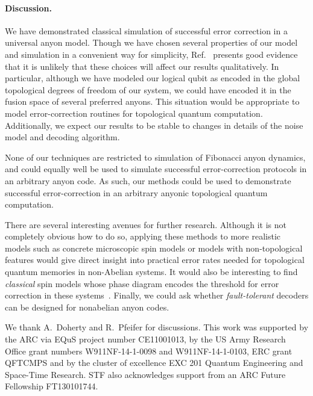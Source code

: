 \documentclass[aps, prl, letterpaper, twocolumn, superscriptaddress, notitlepage, 10pt]{revtex4-1}
\begin{document}
\paragraph{Discussion.}

We have demonstrated classical simulation of successful error correction in a universal anyon model. 
Though we have chosen several properties of our model and 
simulation in a convenient way for simplicity,
Ref.~\cite{Brell2013} presents good evidence that it is
unlikely that these choices will affect our results qualitatively.
In particular, although we have modeled our logical qubit as 
encoded in the global topological degrees of freedom of our 
system, we could have encoded it in the fusion space of several preferred anyons. 
This situation would be appropriate to model error-correction routines for topological quantum computation. 
Additionally, we expect our results to be stable to changes in details of the noise model and decoding algorithm.

None of our techniques are restricted to simulation of Fibonacci anyon dynamics, and could 
equally well be used to simulate successful error-correction protocols in an arbitrary anyon code. 
As such, our methods could be used to demonstrate successful 
error-correction in an arbitrary anyonic topological quantum computation.

There are several interesting avenues for further research. 
Although it is not completely obvious how to do so, 
applying these methods to more realistic models such as concrete 
microscopic spin models or models with non-topological features would give 
direct insight into practical error rates needed for topological quantum memories in non-Abelian systems. 
It would also be interesting to find \emph{classical} spin models 
whose phase diagram encodes the threshold for error correction in these systems~\cite{Dennis2002}.
Finally, we could ask whether 
\emph{fault-tolerant} decoders can be designed for nonabelian anyon codes. 


\acknowledgments 

We thank A.\ Doherty and R.\ Pfeifer for discussions. 
This work was supported by the ARC via EQuS project number CE11001013, by the US Army Research Office grant numbers W911NF-14-1-0098 and W911NF-14-1-0103, ERC grant QFTCMPS and by the cluster of excellence EXC 201 Quantum Engineering and Space-Time Research. STF also acknowledges support from an ARC Future Fellowship FT130101744.


\end{document}
